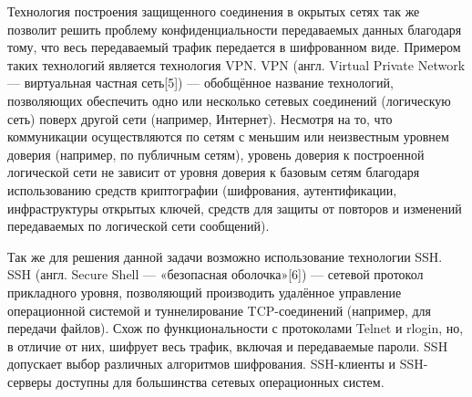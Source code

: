 Технология построения защищенного соединения в окрытых сетях так же позволит решить проблему конфиденциальности передаваемых данных благодаря тому, что весь передаваемый трафик передается в шифрованном виде. Примером таких технологий является технология VPN. VPN (англ. Virtual Private Network — виртуальная частная сеть[5]) — обобщённое название технологий, позволяющих обеспечить одно или несколько сетевых соединений (логическую сеть) поверх другой сети (например, Интернет). Несмотря на то, что коммуникации осуществляются по сетям с меньшим или неизвестным уровнем доверия (например, по публичным сетям), уровень доверия к построенной логической сети не зависит от уровня доверия к базовым сетям благодаря использованию средств криптографии (шифрования, аутентификации, инфраструктуры открытых ключей, средств для защиты от повторов и изменений передаваемых по логической сети сообщений).

Так же для решения данной задачи возможно использование технологии SSH. SSH (англ. Secure Shell — «безопасная оболочка»[6]) — сетевой протокол прикладного уровня, позволяющий производить удалённое управление операционной системой и туннелирование TCP-соединений (например, для передачи файлов). Схож по функциональности с протоколами Telnet и rlogin, но, в отличие от них, шифрует весь трафик, включая и передаваемые пароли. SSH допускает выбор различных алгоритмов шифрования. SSH-клиенты и SSH-серверы доступны для большинства сетевых операционных систем. 

